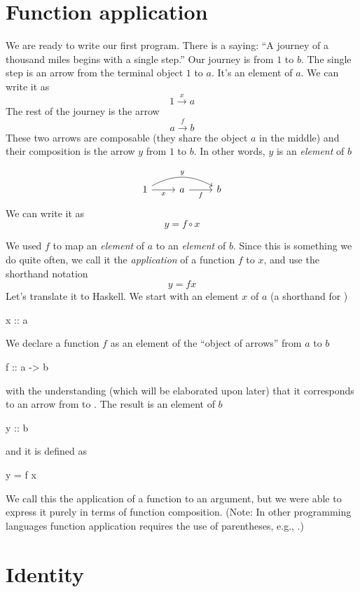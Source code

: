 \documentclass[DaoFP]{subfiles}
\begin{document}
\section{Function application}

We are ready to write our first program. There is a saying: ``A journey of a thousand miles begins with a single step.'' Our journey is from $1$ to $b$. The single step is an arrow from the terminal object $1$ to $a$. It's an element of $a$. We can write it as
\[1 \xrightarrow x a \]
The rest of the journey is the arrow 
\[a \xrightarrow f b\]
These two arrows are composable (they share the object $a$ in the middle) and their composition is the arrow $y$ from $1$ to $b$. In other words, $y$ is an \emph{element} of $b$

\[
 \begin{tikzcd}
 1
 \arrow[rr, bend left, "y"]
 \arrow[r, "x"']
 & a
 \arrow[r, "f"']
& b
 \end{tikzcd}
\]
We can write it as
\[y = f \circ x \]

We used $f$ to map an \emph{element} of $a$ to an \emph{element} of $b$. Since this is something we do quite often, we call it the \emph{application} of a function $f$ to $x$, and use the shorthand notation
\[y = f x \]
Let's translate it to Haskell. We start with an element $x$ of $a$ (a shorthand for )
\begin{haskell}
x :: a
\end{haskell}
We declare a function $f$ as an element of the ``object of arrows'' from $a$ to $b$
\begin{haskell}
f :: a -> b
\end{haskell}
with the understanding (which will be elaborated upon later) that it corresponds to an arrow from  to . The result is an element of $b$
\begin{haskell}
y :: b
\end{haskell}
and it is defined as
\begin{haskell}
y = f x
\end{haskell}
We call this the application of a function to an argument, but we were able to express it purely in terms of function composition. (Note: In other programming languages function application requires the use of parentheses, e.g., .)

\section{Identity}
\end{document}
